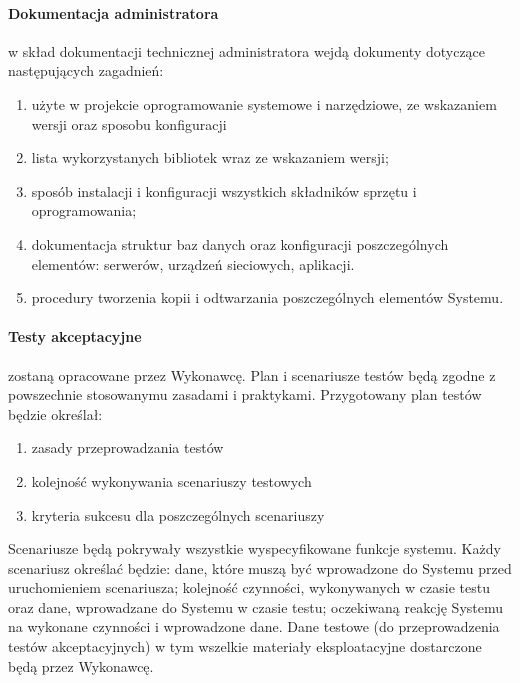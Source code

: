 \documentclass{article}
\begin{document}
\paragraph{Dokumentacja administratora}  w skład dokumentacji technicznej administratora wejdą dokumenty dotyczące następujących zagadnień:
\begin{enumerate}
	\item użyte w projekcie oprogramowanie systemowe i narzędziowe, ze wskazaniem wersji oraz sposobu konfiguracji
	\item lista wykorzystanych bibliotek wraz ze wskazaniem wersji;
	\item sposób instalacji i konfiguracji wszystkich składników sprzętu i oprogramowania;
	\item dokumentacja struktur baz danych oraz konfiguracji poszczególnych elementów: serwerów, urządzeń sieciowych, aplikacji.
	\item procedury tworzenia kopii i odtwarzania poszczególnych elementów Systemu.
\end{enumerate}
\paragraph{Testy akceptacyjne} zostaną opracowane przez Wykonawcę. Plan i scenariusze testów będą zgodne z powszechnie stosowanymu zasadami i praktykami. Przygotowany plan testów będzie określał:
\begin{enumerate}
	\item zasady przeprowadzania testów
	\item kolejność wykonywania scenariuszy testowych
	\item kryteria sukcesu dla poszczególnych scenariuszy
\end{enumerate}
Scenariusze będą pokrywały wszystkie wyspecyfikowane funkcje systemu. Każdy scenariusz określać będzie: dane, które muszą być wprowadzone do Systemu przed uruchomieniem scenariusza; kolejność czynności, wykonywanych w czasie testu oraz dane, wprowadzane do Systemu w czasie testu; oczekiwaną reakcję Systemu na wykonane czynności i wprowadzone dane. Dane testowe (do przeprowadzenia testów akceptacyjnych) w tym wszelkie materiały eksploatacyjne dostarczone będą przez Wykonawcę.
\end{document}

